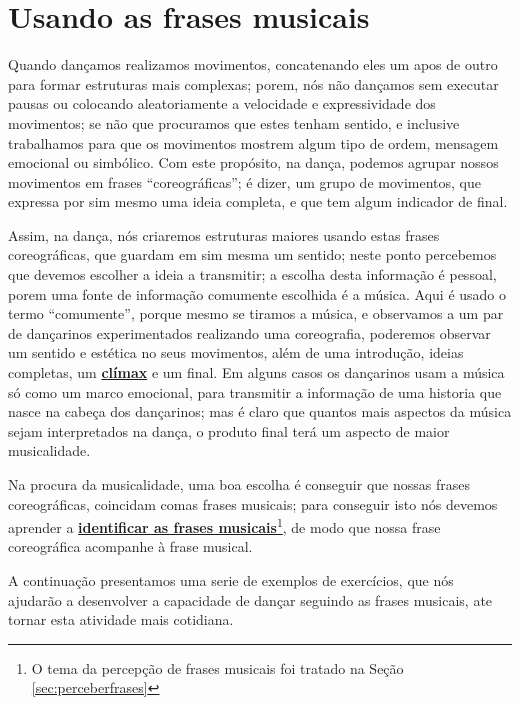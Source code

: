 
\section{Usando as frases musicais}
Quando dançamos realizamos movimentos, 
concatenando eles um apos de outro para formar estruturas mais complexas;
porem, nós não dançamos sem executar pausas ou colocando aleatoriamente a velocidade 
e expressividade dos movimentos; 
se não que procuramos que estes tenham sentido, 
e inclusive trabalhamos para que os movimentos mostrem algum tipo de ordem, mensagem emocional ou simbólico.
Com este propósito, na dança, podemos agrupar nossos movimentos em frases ``coreográficas'';
é dizer, um grupo de movimentos, que expressa por sim mesmo uma ideia completa, 
e que tem algum indicador de final. 

Assim, na dança, 
nós criaremos estruturas maiores usando estas frases coreográficas, 
que guardam em sim mesma um sentido; 
neste ponto percebemos que devemos escolher a ideia a transmitir;
a escolha desta informação é pessoal, porem uma fonte de informação comumente escolhida é a música.
Aqui é usado o termo ``comumente'', porque mesmo se tiramos a música, 
e observamos a um par de dançarinos experimentados realizando uma coreografia, 
poderemos observar um sentido e estética no seus movimentos,
além de uma introdução, ideias completas, um \hyperref[ref:climax]{\textbf{clímax}}  e um final.
Em alguns casos os dançarinos usam a música só como um marco emocional,
para transmitir a informação de uma historia que nasce na cabeça dos dançarinos;
mas é claro que quantos mais aspectos da música sejam interpretados na dança,
o produto final terá um aspecto de maior musicalidade.

Na procura da musicalidade, uma boa escolha é conseguir que nossas frases coreográficas,
coincidam comas frases musicais;
para conseguir isto nós devemos aprender a 
\hyperref[sec:perceberfrases]{\textbf{identificar as frases musicais}}\footnote{O 
tema da percepção de frases musicais foi tratado na Seção \ref{sec:perceberfrases}},
de modo que  nossa frase coreográfica acompanhe à frase musical.

A continuação presentamos uma serie de exemplos de exercícios, 
que nós ajudarão a desenvolver a capacidade de dançar seguindo as frases musicais,
ate tornar esta atividade mais cotidiana.

